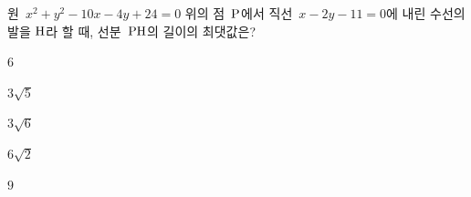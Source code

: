 원~$x^2+y^2-10x-4y+24=0$ 위의 점~$\mathrm{P}$에서 직선~$x-2y-11=0$에 내린 수선의 발을 $\mathrm{H}$라 할 때, 선분~$\mathrm{PH}$의 길이의 최댓값은?
\begin{choices32}{\rule[-3ex]{0pt}{8ex}$6$}{\rule[-3ex]{0pt}{8ex}$3\sqrt{5}$}{\rule[-3ex]{0pt}{8ex}$3\sqrt{6}$}{\rule[-3ex]{0pt}{8ex}$6\sqrt{2}$}{\rule[-3ex]{0pt}{8ex}$9$}\end{choices32}
